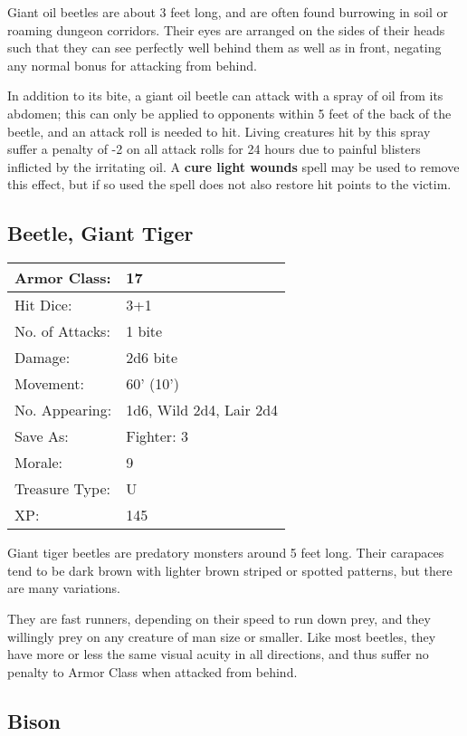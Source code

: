 \documentclass[a4paper,twoside,openany,10pt]{book}
\begin{document}
\begin{multicols}{2}
Giant oil beetles are about 3 feet long, and are often found burrowing in soil or roaming dungeon corridors. Their eyes are arranged on the sides of their heads such that they can see perfectly well behind them as well as in front, negating any normal bonus for attacking from behind.

In addition to its bite, a giant oil beetle can attack with a spray of oil from its abdomen; this can only be applied to opponents within 5 feet of the back of the beetle, and an attack roll is needed to hit. Living creatures hit by this spray suffer a penalty of -2 on all attack rolls for 24 hours due to painful blisters inflicted by the irritating oil. A \textbf{cure light wounds} spell may be used to remove this effect, but if so used the spell does not also restore hit points to the victim.

\subsection*{Beetle, Giant Tiger}\label{beetle-giant-tiger}

\begin{tabularx}{0.48\textwidth}{@{}lX@{}}
Armor Class: & 17 \\\hline
Hit Dice: & 3+1 \\\hline
No. of Attacks: & 1 bite \\\hline
Damage: & 2d6 bite \\\hline
Movement: & 60' (10') \\\hline
No. Appearing: & 1d6, Wild 2d4, Lair 2d4 \\\hline
Save As: & Fighter: 3 \\\hline
Morale: & 9 \\\hline
Treasure Type: & U \\\hline
XP: & 145 \\\hline
\end{tabularx}\medskip

Giant tiger beetles are predatory monsters around 5 feet long. Their carapaces tend to be dark brown with lighter brown striped or spotted patterns, but there are many variations.

They are fast runners, depending on their speed to run down prey, and they willingly prey on any creature of man size or smaller. Like most beetles, they have more or less the same visual acuity in all directions, and thus suffer no penalty to Armor Class when attacked from behind.


\subsection*{Bison}\label{bison}


\end{multicols}
\end{document}
